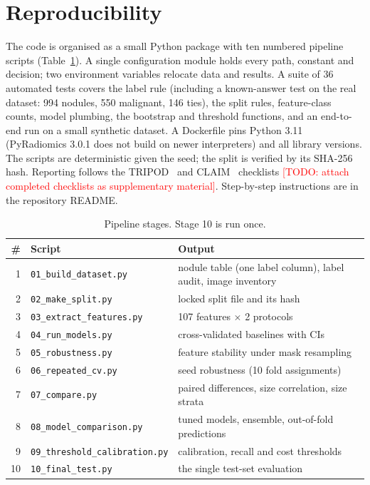 \documentclass[journal]{IEEEtran}
\newcommand{\TODO}[1]{\textcolor{red}{[TODO: #1]}}
\newcommand{\code}[1]{\texttt{#1}}
\begin{document}
\section{Reproducibility}
\label{sec:repro}
The code is organised as a small Python package with ten numbered pipeline scripts (Table~\ref{tab:stages}).
A single configuration module holds every path, constant and decision; two environment variables relocate data and
results. A suite of 36 automated tests covers the label rule (including a known-answer test on the real dataset: 994
nodules, 550 malignant, 146 ties), the split rules, feature-class counts, model plumbing, the bootstrap and threshold
functions, and an end-to-end run on a small synthetic dataset. A Dockerfile pins Python 3.11 (PyRadiomics 3.0.1 does not build
on newer interpreters) and all library versions. The scripts are deterministic given the seed; the split is verified by its SHA-256 hash.
Reporting follows the TRIPOD~\cite{collins2015tripod} and CLAIM~\cite{mongan2020claim} checklists
\TODO{attach completed checklists as supplementary material}. Step-by-step instructions are in the repository README.

\begin{table}[!t]
\caption{Pipeline stages. Stage 10 is run once.}
\label{tab:stages}
\centering\small
\begin{tabular}{rll}
\toprule
\# & Script & Output\\
\midrule
1  & \code{01\_build\_dataset.py}      & nodule table (one label column), label audit, image inventory\\
2  & \code{02\_make\_split.py}         & locked split file and its hash\\
3  & \code{03\_extract\_features.py}   & 107 features $\times$ 2 protocols\\
4  & \code{04\_run\_models.py}         & cross-validated baselines with CIs\\
5  & \code{05\_robustness.py}          & feature stability under mask resampling\\
6  & \code{06\_repeated\_cv.py}        & seed robustness (10 fold assignments)\\
7  & \code{07\_compare.py}             & paired differences, size correlation, size strata\\
8  & \code{08\_model\_comparison.py}   & tuned models, ensemble, out-of-fold predictions\\
9  & \code{09\_threshold\_calibration.py} & calibration, recall and cost thresholds\\
10 & \code{10\_final\_test.py}         & the single test-set evaluation\\
\bottomrule
\end{tabular}
\end{table}
\end{document}
